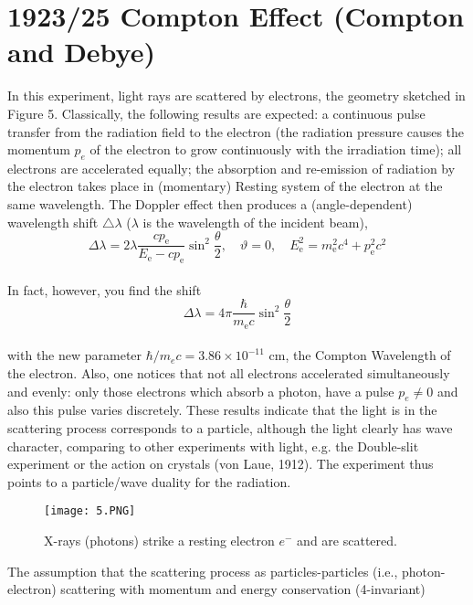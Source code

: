 \section{1923/25 Compton Effect (Compton and Debye)}
In this experiment, light rays are scattered by electrons, the geometry sketched in Figure  5.
Classically, the following results are expected: a continuous pulse transfer from the radiation field to the electron (the radiation pressure causes the momentum $p_e$ of the electron to grow continuously with the irradiation time); all electrons are accelerated equally; the absorption and re-emission of radiation by the electron takes place in (momentary)
Resting system of the electron at the same wavelength. The Doppler effect then produces a (angle-dependent) wavelength shift $\triangle \lambda $ ($\lambda$ is the wavelength of the incident beam),\\
\begin{equation}
\Delta \lambda=2 \lambda \frac{c p_{\mathrm{e}}}{E_{\mathrm{e}}-c p_{\mathrm{e}}} \sin ^{2} \frac{\theta}{2}, \quad \vartheta=0, \quad E_{\mathrm{e}}^{2}=m_{\mathrm{e}}^{2} c^{4}+p_{\mathrm{e}}^{2} c^{2}
\end{equation}\\
In fact, however, you find the shift
\\
\begin{equation}
\Delta \lambda=4 \pi \frac{\hbar}{m_{\mathrm{e}} c} \sin ^{2} \frac{\theta}{2}
\end{equation}\\
with the new parameter $\hbar/m_ec= 3.86\times10^{-11}$ cm, the Compton Wavelength of the electron. Also, one notices that not all electrons accelerated simultaneously and evenly: only those electrons which absorb a photon, have a pulse $p_e \neq 0$ and also
this pulse varies discretely. These results indicate that the light is in the scattering process corresponds to a particle, although the light clearly has wave character, comparing to other experiments with light, e.g. the Double-slit experiment or the action on crystals (von Laue, 1912). The experiment thus points to a particle/wave duality for the radiation.
\begin{figure}[ht]
    \centering
    \texttt{[image: 5.PNG]}
    \caption{X-rays (photons) strike a resting electron $e^-$ and are scattered.}
    \label{fig:5}
\end{figure}
The assumption that the scattering process as particles-particles (i.e., photon-electron) scattering with momentum and energy conservation (4-invariant)
